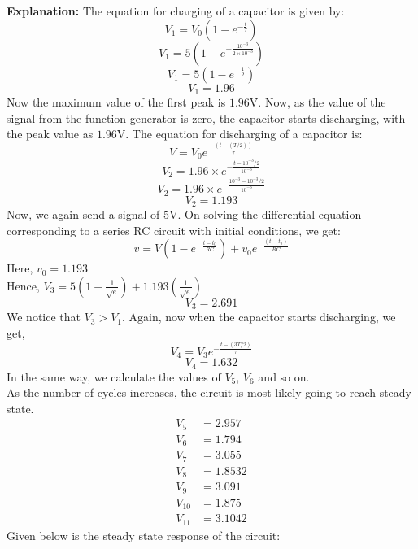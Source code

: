 \documentclass[a4paper,12pt]{article}
\begin{document}
\textbf{Explanation:}
The equation for charging of a capacitor is given by:
$$V_1=V_0(1-e^{-\frac{t}{\tau}})$$
$$V_1=5(1-e^{-\frac{10^{-3}}{2\times 10^{-3}}})$$
$$V_1=5(1-e^{-\frac{1}{2}})$$
$$V_1=1.96$$
Now the maximum value of the first peak is $1.96$V. 
Now, as the value of the signal from the function generator is zero, the capacitor starts discharging, with the peak value as $1.96$V.
The equation for discharging of a capacitor is:
$$V=V_0e^{-\frac{(t-(T/2))}{\tau}}$$
$$V_2=1.96 \times e^{-\frac{t-10^{-3}/2}{10^{-3}}}$$
$$V_2=1.96 \times e^{-\frac{10^{-3}-10^{-3}/2}{10^{-3}}}$$
$$V_2=1.193$$
Now, we again send a signal of $5$V.
On solving the differential equation corresponding to a series RC circuit with initial conditions, we get:\\
$$v=V(1-e^{-\frac{t-t_0}{RC}})+v_0e^{-\frac{(t-t_0)}{RC}}$$
Here, $v_0=1.193$\\
Hence, 
$V_3=5(1-\frac{1}{\sqrt{e}})+1.193(\frac{1}{\sqrt{e}})$
$$V_3=2.691$$
We notice that $V_3 > V_1$.
Again, now when the capacitor starts discharging, we get,
$$V_4=V_3e^{-\frac{t-(3T/2)}{\tau}}$$
$$V_4=1.632$$
In the same way, we calculate the values of $V_5$, $V_6$ and so on.\\
As the number of cycles increases, the circuit is most likely going to reach steady state.
\begin{align}
    V_5&=2.957\\
    V_6&=1.794\\
    V_7&=3.055\\
    V_8&=1.8532\\
    V_9&=3.091\\
    V_{10}&=1.875\\
    V_{11}&=3.1042
\end{align}
Given below is the steady state response of the circuit:
\end{document}
